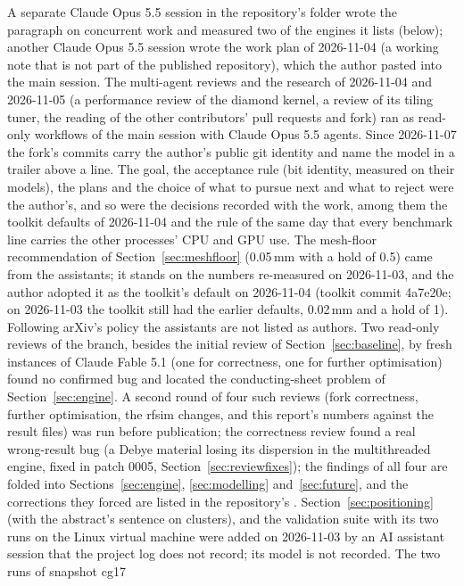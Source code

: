 A separate Claude Opus 5.5 session in the
repository's folder wrote the paragraph on concurrent work and measured two of the engines it lists (below); another
Claude Opus 5.5 session wrote the work plan of 2026-11-04 (a working note that is not part of the published
repository), which the author pasted into the main session. The multi-agent reviews and the research of 2026-11-04
and 2026-11-05 (a performance review of the
diamond kernel, a review of its tiling tuner, the reading of the other contributors' pull requests and fork) ran as
read-only workflows of the main session with Claude Opus 5.5 agents. Since 2026-11-07 the fork's commits carry
the author's public git identity and name the model in a  trailer above a
 line. The goal, the acceptance rule (bit identity,
measured on their models), the plans and the choice of what to pursue next and what to reject were the author's, and so
were the decisions recorded with the work, among them the toolkit defaults of 2026-11-04 and the rule of the same day
that every benchmark line carries the other processes' CPU and GPU use. The mesh-floor recommendation of
Section~\ref{sec:meshfloor} (0.05\,mm with a hold of 0.5) came from the assistants; it stands on the numbers
re-measured on 2026-11-03, and the author adopted it as the toolkit's default on 2026-11-04 (toolkit commit 4a7e20e;
on 2026-11-03 the toolkit still had the earlier defaults, 0.02\,mm and a hold of 1). Following arXiv's policy the
assistants are not listed as authors. Two read-only reviews of the branch,
besides the initial review of Section~\ref{sec:baseline}, by fresh instances of Claude Fable 5.1 (one for
correctness, one for further optimisation) found no confirmed bug and located the conducting-sheet problem of
Section~\ref{sec:engine}. A second round of four such reviews (fork correctness, further optimisation, the rfsim
changes, and this report's numbers against the result files) was run before publication; the correctness
review found a real wrong-result bug (a Debye material losing its dispersion in the multithreaded engine, fixed in
patch 0005, Section~\ref{sec:reviewfixes}); the findings of all four are folded into Sections~\ref{sec:engine},
\ref{sec:modelling} and~\ref{sec:future}, and the corrections they forced are listed in the repository's
. Section~\ref{sec:positioning} (with the abstract's sentence on clusters),  and the
validation suite  with its two runs on the Linux virtual machine were added on 2026-11-03 by an
AI assistant session that the project log does not record; its model is not recorded. The two runs of snapshot cg17
